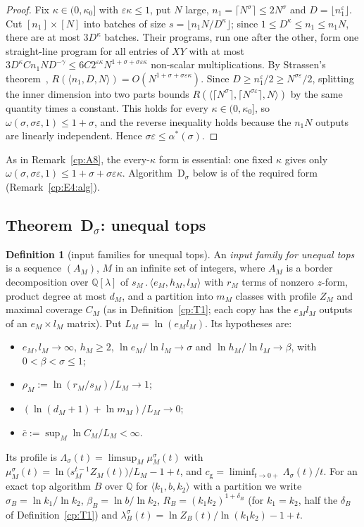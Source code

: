 \documentclass[11pt]{article}
\theoremstyle{definition}
\newtheorem{definition}[theorem]{Definition}
\theoremstyle{remark}
\providecommand{\eps}{\varepsilon}
\providecommand{\Q}{\mathbb{Q}}
\newcommand{\mat}[3]{\langle #1,#2,#3\rangle} %
\newcommand{\cp}{\mathbin{.}}                 %
\newcommand{\ZB}{Z_B}                         %
\newcommand{\delB}{\delta_B}                  %
\newcommand{\RB}{R_B}                         %
\newcommand{\Lam}{\Lambda}                    %
\newcommand{\cg}{c_{\mathrm g}}               %
\newcommand{\cbar}{\bar c}                    %
\newcommand{\Hscond}[1]{\textup{(H#1$_\sigma$)}} %
\newcommand{\ThmDsig}{Theorem~D\texorpdfstring{\ensuremath{_\sigma}}{\_sigma}}   %
\newcommand{\alstar}{\alpha^*}                %
\begin{document}
\begin{proof}
Fix $\kappa\in(0,\kappa_0]$ with $\eps\kappa\le1$, put $N$ large, $n_1=\lceil N^\sigma\rceil\le2N^\sigma$ and $D=\lfloor n_1^\eps\rfloor$. Cut $[n_1]\times[N]$ into batches of size $s=\lfloor n_1N/D^\kappa\rfloor$; since $1\le D^\kappa\le n_1\le n_1N$, there are at most $3D^\kappa$ batches. Their programs, run one after the other, form one straight-line program for all entries of $XY$ with at most $3D^\kappa Cn_1ND^{-\gamma}\le6C2^{\eps\kappa}N^{1+\sigma+\sigma\eps\kappa}$ non-scalar multiplications. By Strassen's theorem~\cite{Str73}, $R(\mat{n_1}DN)=O(N^{1+\sigma+\sigma\eps\kappa})$. Since $D\ge n_1^\eps/2\ge N^{\sigma\eps}/2$, splitting the inner dimension into two parts bounds $R(\mat{\lceil N^\sigma\rceil}{\lceil N^{\sigma\eps}\rceil}N)$ by the same quantity times a constant. This holds for every $\kappa\in(0,\kappa_0]$, so $\omega(\sigma,\sigma\eps,1)\le1+\sigma$, and the reverse inequality holds because the $n_1N$ outputs are linearly independent. Hence $\sigma\eps\le\alstar(\sigma)$.
\end{proof}

As in Remark~\ref{cp:A8}, the every-$\kappa$ form is essential: one fixed $\kappa$ gives only $\omega(\sigma,\sigma\eps,1)\le1+\sigma+\sigma\eps\kappa$. Algorithm~D$_\sigma$ below is of the required form (Remark~\ref{cp:E4:alg}).

\subsection{\texorpdfstring{\ThmDsig}{Theorem D\_sigma}: unequal tops}\label{cp:sec:unequal-Ds}

\begin{definition}[input families for unequal tops]\label{cp:E3:def}
An \emph{input family for unequal tops} is a sequence $(A_M)$, $M$ in an infinite set of integers, where $A_M$ is a border decomposition over $\Q[\lambda]$ of $s_M\cp\mat{e_M}{h_M}{l_M}$ with $r_M$ terms of nonzero $z$-form, product degree at most $d_M$, and a partition into $m_M$ classes with profile $Z_M$ and maximal coverage $C_M$ (as in Definition~\ref{cp:T1}; each copy has the $e_Ml_M$ outputs of an $e_M\times l_M$ matrix). Put $L_M=\ln(e_Ml_M)$. Its hypotheses are:
\begin{itemize}
\item[\Hscond1] $e_M,l_M\to\infty$, $h_M\ge2$, $\ln e_M/\ln l_M\to\sigma$ and $\ln h_M/\ln l_M\to\beta$, with $0<\beta<\sigma\le1$;
\item[\Hscond2] $\rho_M:=\ln(r_M/s_M)/L_M\to1$;
\item[\Hscond3] $(\ln(d_M+1)+\ln m_M)/L_M\to0$;
\item[\Hscond4] $\cbar:=\sup_M\ln C_M/L_M<\infty$.
\end{itemize}
Its profile is $\Lam_\sigma(t)=\limsup_M\mu^\sigma_M(t)$ with $\mu^\sigma_M(t)=\ln\bigl(s_M^{t-1}Z_M(t)\bigr)/L_M-1+t$, and $\cg=\liminf_{t\to0+}\Lam_\sigma(t)/t$. For an exact top algorithm $B$ over $\Q$ for $\mat{k_1}b{k_2}$ with a partition we write $\sigma_B=\ln k_1/\ln k_2$, $\beta_B=\ln b/\ln k_2$, $\RB=(k_1k_2)^{1+\delB}$ (for $k_1=k_2$, half the $\delB$ of Definition~\ref{cp:T1}) and $\lambda^\sigma_B(t)=\ln\ZB(t)/\ln(k_1k_2)-1+t$.
\end{definition}
\end{document}
